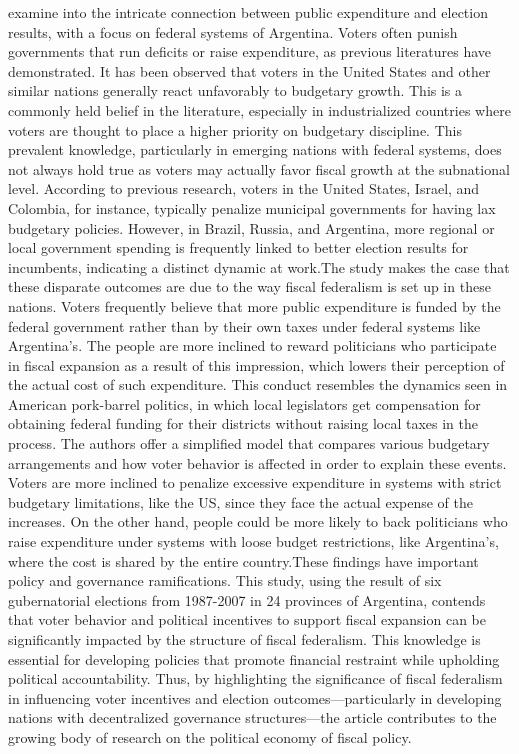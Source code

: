  examine into the intricate connection between public expenditure and election results, with a focus on federal systems of Argentina. Voters often punish governments that run deficits or raise expenditure, as previous literatures have demonstrated. It has been observed that voters in the United States and other similar nations generally react unfavorably to budgetary growth. This is a commonly held belief in the literature, especially in industrialized countries where voters are thought to place a higher priority on budgetary discipline. This prevalent knowledge, particularly in emerging nations with federal systems, does not always hold true as voters may actually favor fiscal growth at the subnational level. According to previous research, voters in the United States, Israel, and Colombia, for instance, typically penalize municipal governments for having lax budgetary policies. However, in Brazil, Russia, and Argentina, more regional or local government spending is frequently linked to better election results for incumbents, indicating a distinct dynamic at work.The study makes the case that these disparate outcomes are due to the way fiscal federalism is set up in these nations. Voters frequently believe that more public expenditure is funded by the federal government rather than by their own taxes under federal systems like Argentina's. The people are more inclined to reward politicians who participate in fiscal expansion as a result of this impression, which lowers their perception of the actual cost of such expenditure. This conduct resembles the dynamics seen in American pork-barrel politics, in which local legislators get compensation for obtaining federal funding for their districts without raising local taxes in the process. The authors offer a simplified model that compares various budgetary arrangements and how voter behavior is affected in order to explain these events. Voters are more inclined to penalize excessive expenditure in systems with strict budgetary limitations, like the US, since they face the actual expense of the increases. On the other hand, people could be more likely to back politicians who raise expenditure under systems with loose budget restrictions, like Argentina's, where the cost is shared by the entire country.These findings have important policy and governance ramifications. This study, using the result of six gubernatorial elections from 1987-2007 in 24 provinces of Argentina, contends that voter behavior and political incentives to support fiscal expansion can be significantly impacted by the structure of fiscal federalism. This knowledge is essential for developing policies that promote financial restraint while upholding political accountability. Thus, by highlighting the significance of fiscal federalism in influencing voter incentives and election outcomes—particularly in developing nations with decentralized governance structures—the article contributes to the growing body of research on the political economy of fiscal policy.\\
